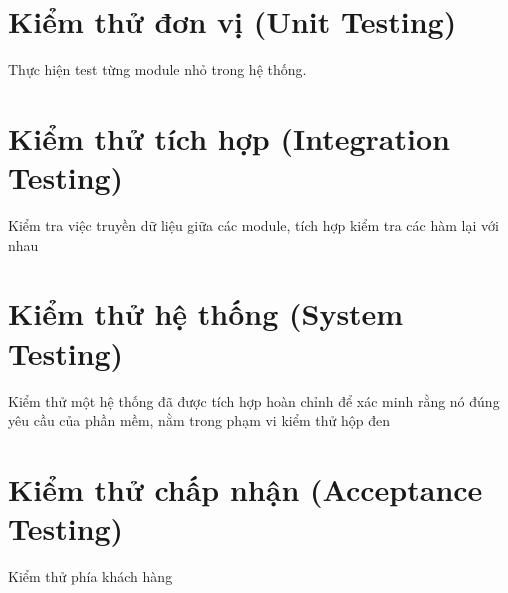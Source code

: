 \section{Kiểm thử đơn vị (Unit Testing)}
\hspace{0.5cm} Thực hiện test từng module nhỏ trong hệ thống.


\section{Kiểm thử tích hợp (Integration Testing)}
\hspace{0.5cm} Kiểm tra việc truyền dữ liệu giữa các module, tích hợp kiểm tra các hàm lại với nhau


\section{Kiểm thử hệ thống (System Testing)}
\hspace{0.5cm} Kiểm thử một hệ thống đã được tích hợp hoàn chỉnh để xác minh rằng nó đúng yêu cầu của phần mềm, nằm trong phạm vi kiểm thử hộp đen


\section{Kiểm thử chấp nhận (Acceptance Testing)}
\hspace{0.5cm} Kiểm thử phía khách hàng




